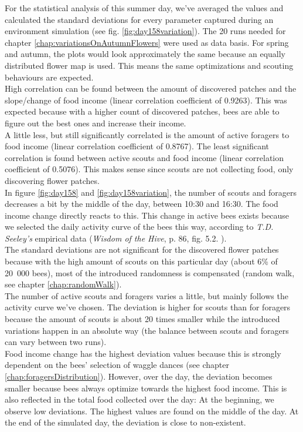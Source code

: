 		
		For the statistical analysis of this summer day, we've averaged the values and calculated the standard deviations for every parameter captured during an environment simulation (see fig. \ref{fig:day158variation}). The 20 runs needed for chapter \ref{chap:variationsOnAutumnFlowers} were used as data basis. For spring and autumn, the plots would look approximately the same because an equally distributed flower map is used. This means the same optimizations and scouting behaviours are expected.\\
		High correlation can be found between the amount of discovered patches and the slope/change of food income (linear correlation coefficient of 0.9263). This was expected because with a higher count of discovered patches, bees are able to figure out the best ones and increase their income.\\
		A little less, but still significantly correlated is the amount of active foragers to food income (linear correlation coefficient of 0.8767). The least significant correlation is found between active scouts and food income (linear correlation coefficient of 0.5076). This makes sense since scouts are not collecting food, only discovering flower patches.\\
		In figure \ref{fig:day158} and \ref{fig:day158variation}, the number of scouts and foragers decreases a bit by the middle of the day, between 10:30 and 16:30. The food income change directly reacts to this. This change in active bees exists because we selected the daily activity curve of the bees this way, according to \textit{T.D. Seeley's} empirical data (\textit{Wisdom of the Hive}, p. 86, fig. 5.2. \cite{seeley95}).\\
		
		The standard deviations are not significant for the discovered flower patches because with the high amount of scouts on this particular day (about 6\% of 20~000 bees), most of the introduced randomness is compensated (random walk, see chapter \ref{chap:randomWalk}).\\
		The number of active scouts and foragers varies a little, but mainly follows the activity curve we've chosen. The deviation is higher for scouts than for foragers because the amount of scouts is about 20 times smaller while the introduced variations happen in an absolute way (the balance between scouts and foragers can vary between two runs).\\
		Food income change has the highest deviation values because this is strongly dependent on the bees' selection of waggle dances (see chapter \ref{chap:foragersDistribution}). However, over the day, the deviation becomes smaller because bees always optimize towards the highest food income. This is also reflected in the total food collected over the day: At the beginning, we observe low deviations. The highest values are found on the middle of the day. At the end of the simulated day, the deviation is close to non-existent.
		
